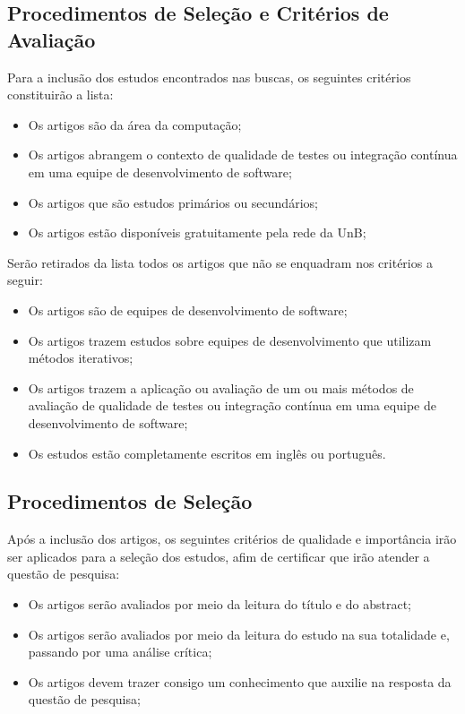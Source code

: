 \subsection{Procedimentos de Seleção e Critérios de Avaliação}
\label{sub:Procedimentos de Seleção e Critérios de Avaliação}

Para a inclusão dos estudos encontrados nas buscas, os seguintes
critérios constituirão a lista:

\begin{itemize}
    \item Os artigos são da área da computação;
    \item Os artigos abrangem o contexto de qualidade de testes ou integração
        contínua em uma equipe de desenvolvimento de software;
    \item Os artigos que são estudos primários ou secundários;
    \item Os artigos estão disponíveis gratuitamente pela rede da UnB;
\end{itemize}

Serão retirados da lista todos os artigos que não se enquadram nos
critérios a seguir:

\begin{itemize}
    \item Os artigos são de equipes de desenvolvimento de software;
    \item Os artigos trazem estudos sobre equipes de desenvolvimento que
        utilizam métodos iterativos;
    \item Os artigos trazem a aplicação ou avaliação de um ou mais
        métodos de avaliação de qualidade de testes ou integração contínua
        em uma equipe de desenvolvimento de software;
    \item Os estudos estão completamente escritos em inglês ou português.
\end{itemize}

\subsection{Procedimentos de Seleção}
\label{sub:Procedimentos de Seleção}

Após a inclusão dos artigos, os seguintes critérios de qualidade e
importância irão ser aplicados para a seleção dos estudos, afim de certificar que
irão atender a questão de pesquisa:

\begin{itemize}
    \item Os artigos serão avaliados por meio da leitura do título e do abstract;
    \item Os artigos serão avaliados por meio da leitura do estudo na sua
        totalidade e, passando por uma análise crítica;
    \item Os artigos devem trazer consigo um conhecimento que auxilie na
        resposta da questão de pesquisa;
\end{itemize}
